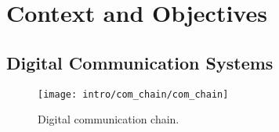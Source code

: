 
\graphicspath{{main/chapter1/fig/}}

\chapter{Context and Objectives}
\label{chap:ctx}

\vspace*{\fill}
\minitoccustom
\vspace*{\fill}

\section{Digital Communication Systems}


\begin{figure}[htp]
  \centering
  \texttt{[image: intro/com\_chain/com\_chain]}
  \caption{Digital communication chain.}
  \label{fig:intro_com_chain}
\end{figure}

